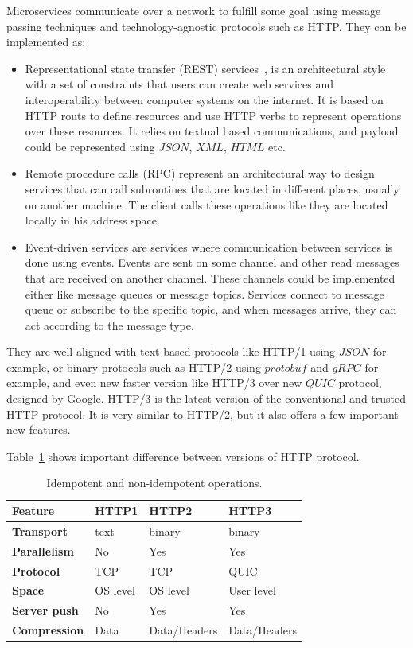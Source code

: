 Microservices communicate over a network to fulfill some goal using message passing techniques and technology-agnostic protocols such as HTTP. They can be implemented as:

\begin{itemize}
	\item Representational state transfer (REST) services~\cite{AdamczykSJH11}, is an architectural style with a set of constraints that users can create web services and interoperability between computer systems on the internet. It is based on HTTP routs to define resources and use HTTP verbs to represent operations over these resources. It relies on textual based communications, and payload could be represented using $JSON$, $XML$, $HTML$ etc.
	\item Remote procedure calls (RPC) represent an architectural way to design services that can call subroutines that are located in different places, usually on another machine. The client calls these operations like they are located locally in his address space.
	\item Event-driven services are services where communication between services is done using events. Events are sent on some channel and other read messages that are received on another channel. These channels could be implemented either like message queues or message topics. Services connect to message queue or subscribe to the specific topic, and when messages arrive, they can act according to the message type.
\end{itemize}

\noindent
They are well aligned with text-based protocols like HTTP/1 using $JSON$ for example, or binary protocols such as HTTP/2 using $protobuf$ and $gRPC$ for example, and even new faster version like HTTP/3 over new $QUIC$ protocol, designed by Google. HTTP/3 is the latest version of the conventional and trusted HTTP protocol. It is very similar to HTTP/2, but it also offers a few important new features. 

Table~\ref{tab:table9} shows important difference between versions of HTTP protocol.

\begin{table}[h!]
	\begin{center}
		\begin{tabular}{l|l|l|l}
			\textbf{Feature} & \textbf{HTTP1} & \textbf{HTTP2} & \textbf{HTTP3}\\
			\hline
			\textbf{Transport} & text & binary & binary\\
			\textbf{Parallelism} & No & Yes & Yes\\
			\textbf{Protocol} & TCP & TCP & QUIC \\
			\textbf{Space} & OS level & OS level & User level\\
			\textbf{Server push} & No & Yes & Yes\\
			\textbf{Compression} & Data & Data/Headers & Data/Headers\\
		\end{tabular}
	\end{center}
	\vspace{-0.5cm}
	\caption{Idempotent and non-idempotent operations.}
	\label{tab:table9}
\end{table}

